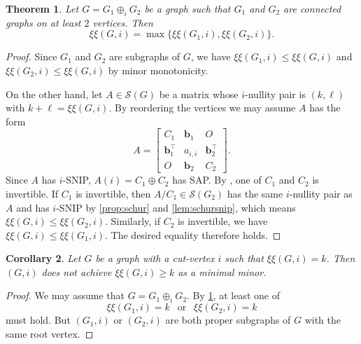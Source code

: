 \documentclass{article}
\newtheorem{theorem}{Theorem}[section]
\newtheorem{corollary}[theorem]{Corollary}
\theoremstyle{definition}
\newcommand{\trans}{^\top}
\newcommand{\bb}{\mathbf{b}}
\newcommand{\mptn}{\mathcal{S}} %
\newcommand{\excise}{\xi\xi}
\begin{document}
\begin{theorem}
\label{thm:cutvtx}
Let $G = G_1\oplus_i G_2$ be a graph such that $G_1$ and $G_2$ are connected graphs on at least $2$ vertices.  Then  
\[
    \excise(G,i) = \max\{\excise(G_1,i), \excise(G_2,i)\}.
\]
\end{theorem}
\begin{proof}
Since $G_1$ and $G_2$ are subgraphs of $G$, we have $\excise(G_1, i) \leq \excise(G, i)$ and $\excise(G_2, i) \leq \excise(G, i)$ by minor monotonicity.  

On the other hand, let $A\in\mptn(G)$ be a matrix whose $i$-nullity pair is $(k,\ell)$ with $k + \ell = \excise(G, i)$.  By reordering the vertices we may assume $A$ has the form  
\[
    A = \begin{bmatrix}
        C_1 & \bb_1 & O \\
        \bb_1\trans & a_{i,i} & \bb_2\trans \\
        O & \bb_2 & C_2
    \end{bmatrix}.
\]
Since $A$ has $i$-SNIP, $A(i) = C_1\oplus C_2$ has SAP.  By \cite[Lemma~3.1]{BFH05}, one of $C_1$ and $C_2$ is invertible.  If $C_1$ is invertible, then $A/C_1\in\mptn(G_2)$ has the same $i$-nullity pair as $A$ and has $i$-SNIP  by \cref{prop:schur} and \cref{lem:schursnip}, which means $\excise(G,i) \leq \excise(G_2, i)$.  Similarly, if $C_2$ is invertible, we have $\excise(G, i) \leq \excise(G_1, i)$.  The desired equality therefore holds. 
\end{proof}

\begin{corollary}
Let $G$ be a graph with a cut-vertex $i$
such that $\excise(G, i) = k$.  Then $(G,i)$ does not achieve $\excise(G, i) \ge k$ as a minimal minor.
\end{corollary}
\begin{proof}
We may assume that $G = G_1\oplus_i G_2$.  By \cref{thm:cutvtx},
at least one of
\[
\excise(G_1, i) = k \ \ \mbox{ or }\ \ \excise(G_2, i) = k
\]
must hold.
But $(G_1,i)$ or $(G_2,i)$ are both proper subgraphs of $G$ with the same root vertex. 
\end{proof}
\end{document}
